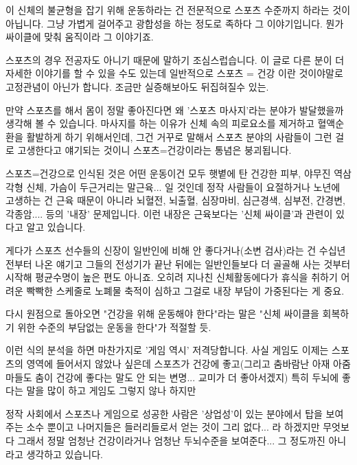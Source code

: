 이 신체의 불균형을 잡기 위해 운동하라는 건 전문적으로 스포츠 수준까지 하라는 것이 아닙니다.
그냥 가볍게 걸어주고 광합성을 하는 정도로 족하다 그 이야기입니다. 뭔가 싸이클에 맞춰 움직이라 그 이야기죠.
\vspace{5mm}

스포츠의 경우 전공자도 아니기 때문에 말하기 조심스럽습니다. 이 글로 다른 분이 더 자세한 이야기를 할 수 있을 수도 있는데
일반적으로 스포츠 = 건강 이란 것이야말로 고정관념이 아닌가 합니다. 조금만 실증해보아도 뒤집혀질수 있는.
\vspace{5mm}

만약 스포츠를 해서 몸이 정말 좋아진다면 왜 '스포츠 마사지'라는 분야가 발달했을까 생각해 볼 수 있습니다.
마사지를 하는 이유가 신체 속의 피로요소를 제거하고 혈액순환을 활발하게 하기 위해서인데,
그건 거꾸로 말해서 스포츠 분야의 사람들이 그런 걸로 고생한다고 얘기되는 것이니 스포츠=건강이라는 통념은 붕괴됩니다.
\vspace{5mm}

스포츠=건강으로 인식된 것은 어떤 운동이건 모두 햇볕에 탄 건강한 피부, 야무진 역삼각형 신체, 가슴이 두근거리는 말근육... 일 것인데
정작 사람들이 요절하거나 노년에 고생하는 건 근육 때문이 아니라
뇌혈전, 뇌출혈, 심장마비, 심근경색, 심부전, 간경변, 각종암.... 등의 '내장' 문제입니다.
이런 내장은 근육보다는 '신체 싸이클'과 관련이 있다고 알고 있습니다.
\vspace{5mm}

게다가 스포츠 선수들의 신장이 일반인에 비해 안 좋다거나(소변 검사)라는 건 수십년 전부터 나온 얘기고
그들의 전성기가 끝난 뒤에는 일반인들보다 더 골골해 사는 것부터 시작해 평균수명이 높은 편도 아니죠.
오히려 지나친 신체활동에다가 휴식을 취하기 어려운 빡빡한 스케줄로 노폐물 축적이 심하고 그걸로 내장 부담이 가중된다는 게 중요.
\vspace{5mm}

다시 원점으로 돌아오면 "건강을 위해 운동해야 한다"라는 말은 "신체 싸이클을 회복하기 위한 수준의 부담없는 운동을 한다"가 적절할 듯.
\vspace{5mm}

이런 식의 분석을 하면 마찬가지로 '게임 역시' 저격당합니다. 사실 게임도 이제는 스포츠의 영역에 들어서지 않았나 싶은데
스포츠가 건강에 좋고(그리고 춤바람난 아재 아줌마들도 춤이 건강에 좋다는 말도 안 되는 변명... 교미가 더 좋아서겠지)
특히 두뇌에 좋다는 말을 많이 하고 게임도 그렇지 않나 하지만
\vspace{5mm}

정작 사회에서 스포츠나 게임으로 성공한 사람은 '상업성'이 있는 분야에서 탑을 보여주는 소수 뿐이고
나머지들은 들러리들로서 얻는 것이 그리 없다... 라 하겠지만 무엇보다 그래서 정말 엄청난 건강이라거나 엄청난 두뇌수준을 보여준다...
그 정도까진 아니라고 생각하고 있습니다.
\vspace{5mm}

